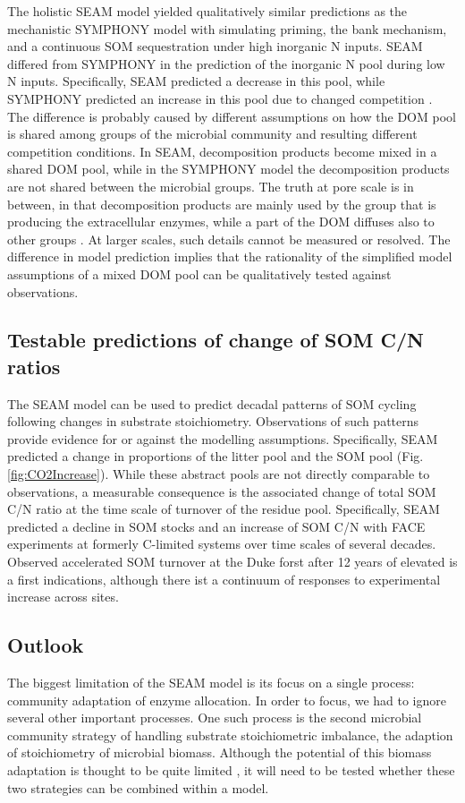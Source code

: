 The holistic SEAM model yielded qualitatively similar predictions as the
mechanistic SYMPHONY model with simulating priming, the bank mechanism, and a
continuous SOM sequestration under high inorganic N inputs. SEAM differed from
SYMPHONY in the prediction of the inorganic N pool during low N inputs.
Specifically, SEAM predicted a decrease in this pool, while SYMPHONY predicted an
increase in this pool due to changed competition \citep{Perveen14}. The
difference is probably caused by different assumptions on how the DOM pool is
shared among groups of the microbial community and resulting different
competition conditions. In SEAM, decomposition products become mixed
in a shared DOM pool, while in the SYMPHONY model the decomposition products are
not shared between the microbial groups.
The truth at pore scale is in between, in that decomposition products are mainly
used by the group that is producing the extracellular enzymes, while a part of
the DOM diffuses also to other groups \citep{Kaiser14}. At larger scales, such
details cannot be measured or resolved. The difference in model prediction
implies that the rationality of the simplified model assumptions of a mixed
DOM pool can be qualitatively tested against observations. 

\subsection{Testable predictions of change of SOM C/N ratios}
The SEAM model can be used to predict decadal patterns of SOM cycling following
changes in substrate stoichiometry. Observations of such patterns provide evidence
for or against the modelling assumptions.
Specifically, SEAM predicted a change in proportions of the litter pool and the
SOM pool (Fig. \ref{fig:CO2Increase}). While these abstract pools are not
directly comparable to observations, a measurable consequence is the associated
change of total SOM C/N ratio at the time scale of turnover of the residue
pool. Specifically, SEAM predicted a decline in SOM stocks and an increase of
SOM C/N with FACE experiments at formerly C-limited systems over time scales of
several decades. Observed accelerated SOM turnover at the Duke forst after 12
years of elevated  \citep{Drake11} is a first indications, although
there ist a continuum of responses to experimental  increase across sites.
 
\subsection{Outlook} 
The biggest limitation of the SEAM model is its focus on a single process:
community adaptation of enzyme allocation. In order to focus, we had to ignore
several other important processes. One such process is the second microbial
community strategy of handling substrate stoichiometric imbalance, the adaption
of stoichiometry of microbial biomass. Although the potential of this biomass
adaptation is thought to be quite limited \citep{Mooshammer14}, it will need to
be tested whether these two strategies can be combined within a model.

